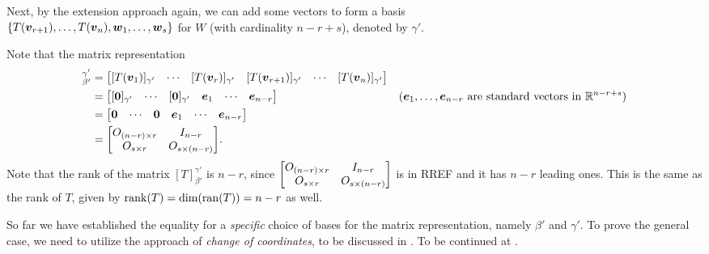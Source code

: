 \begin{enumerate}
\begin{pf}
Next, by the extension approach again, we can add some vectors to form a
basis\\
\(\{T(\vb*{v}_{r+1}),\dotsc,T(\vb*{v}_n),\vb*{w}_1,\dotsc,\vb*{w}_s\}\) for
\(W\) (with cardinality \(n-r+s\)), denoted by \(\gamma'\).

Note that the matrix representation
\begin{align*}
[T]_{\beta'}^{\gamma'}
&=\mqty[
[T(\vect{v}_1)]_{\gamma'}&\cdots&[T(\vect{v}_r)]_{\gamma'}
&[T(\vect{v}_{r+1})]_{\gamma'}&\cdots&[T(\vect{v}_{n})]_{\gamma'}
] \\
&=\mqty[
[\vect{0}]_{\gamma'}&\cdots&[\vect{0}]_{\gamma'}
&\vect{e}_1&\cdots&\vect{e}_{n-r}
]
&\text{(\(\vect{e}_1,\dotsc,\vect{e}_{n-r}\) are standard vectors in \(\R^{n-r+s}\))} \\
&=\mqty[
\vect{0}&\cdots&\vect{0}
&\vect{e}_1&\cdots&\vect{e}_{n-r}
] \\
&=\mqty[
O_{(n-r)\times r}&I_{n-r}\\
O_{s\times r}&O_{s\times (n-r)}
].
\end{align*}
Note that the rank of the matrix \([T]_{\beta'}^{\gamma'}\) is \(n-r\), since
\(\mqty[ O_{(n-r)\times r}&I_{n-r}\\ O_{s\times r}&O_{s\times (n-r)} ]\) is in
RREF and it has \(n-r\) leading ones. This is the same as the rank of \(T\),
given by \(\operatorname{rank}(T)=\dim(\operatorname{ran}(T))=n-r\) as well.

So far we have established the equality for a \emph{specific} choice of bases
for the matrix representation, namely \(\beta'\) and \(\gamma'\). To prove the
general case, we need to utilize the approach of \emph{change of coordinates},
to be discussed in . To be continued at
.
\end{pf}
\end{enumerate}
